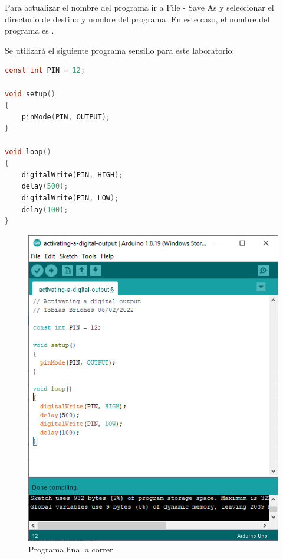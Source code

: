 \documentclass{article}
\begin{document}
    Para actualizar el nombre del programa ir a File - Save As y seleccionar
    el directorio de destino y nombre del programa. En este caso, el nombre
    del programa es .

    \bigbreak

    Se utilizará el siguiente programa sensillo para este laboratorio:

    \begin{lstlisting}[language=C, caption=Programa para activar una salida
    digital, label={lst:lstlisting}]
const int PIN = 12;

void setup()
{
    pinMode(PIN, OUTPUT);
}

void loop()
{
    digitalWrite(PIN, HIGH);
    delay(500);
    digitalWrite(PIN, LOW);
    delay(100);
}
    \end{lstlisting}

    \begin{figure}[H]
        \centering
        \includegraphics[width=0.3\paperwidth]{images/arduino-2}
        \caption{Programa final a correr}\label{fig:figure3}
    \end{figure}
\end{document}
